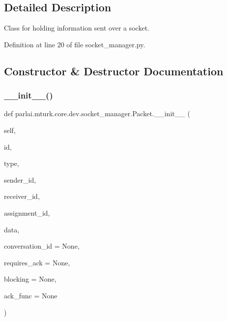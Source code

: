 \subsection{Detailed Description}
\begin{DoxyVerb}Class for holding information sent over a socket.
\end{DoxyVerb}
 

Definition at line 20 of file socket\+\_\+manager.\+py.



\subsection{Constructor \& Destructor Documentation}
\mbox{\label{classparlai_1_1mturk_1_1core_1_1dev_1_1socket__manager_1_1Packet_a7e36ad36f81a8e412efa30404b7dd07d}} 
\subsubsection{\texorpdfstring{\+\_\+\+\_\+init\+\_\+\+\_\+()}{\_\_init\_\_()}}
{\footnotesize\ttfamily def parlai.\+mturk.\+core.\+dev.\+socket\+\_\+manager.\+Packet.\+\_\+\+\_\+init\+\_\+\+\_\+ (\begin{DoxyParamCaption}\item[{}]{self,  }\item[{}]{id,  }\item[{}]{type,  }\item[{}]{sender\+\_\+id,  }\item[{}]{receiver\+\_\+id,  }\item[{}]{assignment\+\_\+id,  }\item[{}]{data,  }\item[{}]{conversation\+\_\+id = {\ttfamily None},  }\item[{}]{requires\+\_\+ack = {\ttfamily None},  }\item[{}]{blocking = {\ttfamily None},  }\item[{}]{ack\+\_\+func = {\ttfamily None} }\end{DoxyParamCaption})}

